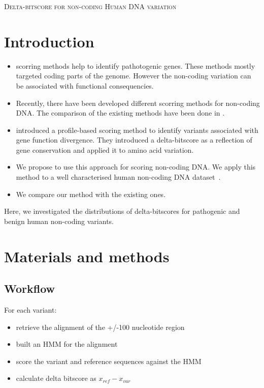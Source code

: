\documentclass[12pt,article]{article}
\begin{document}
\begin{center}
\Large{\scshape Delta-bitscore for non-coding Human DNA variation} 
\end{center}

\section{Introduction}

\begin{itemize}

\item scorring methods help to identify pathotogenic genes. These methods mostly targeted coding parts of the genome. However the non-coding variation can be associated with functional consequencies. 

\item Recently, there have been developed different scorring methods for non-coding DNA. The comparison of the existing methods have been done in \citet{drubay2018benchmark}.

\item \citet{wheeler2016profile} introduced a profile-based scoring method to identify variants associated with gene function divergence. They introduced a delta-bitscore as a reflection of gene conservation and applied it to amino acid variation. 

\item We propose to use this approach for scoring non-coding DNA. We apply this method to a well characterised human non-coding DNA dataset~\citep{biggs2020ncVarDB}. 

\item We compare our method with the existing ones. 

\end{itemize}

Here, we investigated the distributions of delta-bitscores for pathogenic and benign human non-coding variants. 

\section{Materials and methods}

\subsection{Workflow} 

For each variant:

\begin{itemize}
\item retrieve the alignment of the  +/-100 nucleotide region 
\item built an HMM for the alignment
\item score the variant and reference sequences against the HMM
\item calculate delta bitscore as $x_{ref} - x_{var}$
\end{itemize}
\end{document}
